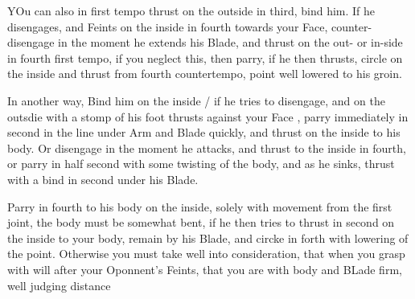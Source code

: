 YOu can also in first tempo thrust on the outside in third, bind
him. If he disengages, and Feints on the inside in fourth towards your
Face, counter-disengage in the moment he extends his Blade, and thrust
on the out- or in-side in fourth first tempo, if you neglect this,
then parry, if he then thrusts, circle on the inside and thrust from
fourth countertempo, point well lowered to his groin.


In another way, Bind him on the inside / if he tries to disengage, and
on the outsdie with a stomp of his foot thrusts against your Face ,
parry immediately in second in the line under Arm and Blade quickly,
and thrust on the inside to his body. Or disengage in the moment he
attacks, and thrust to the inside in fourth, or parry in half second
with some twisting of the body, and as he sinks, thrust with a bind in
second under his Blade.


Parry in fourth to his body on the inside, solely with movement from
the first joint, the body must be somewhat bent, if he then tries to
thrust in second on the inside to your body, remain by his Blade, and
circke in forth with lowering of the point. Otherwise you must take
well into consideration, that when you grasp with will after your
Oponnent's Feints, that you are with body and BLade firm, well judging distance
